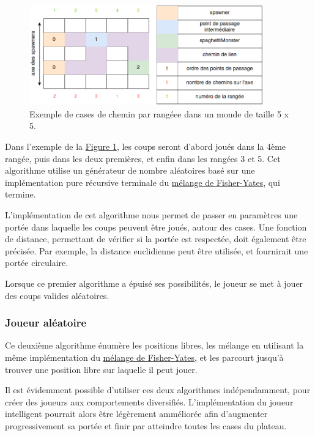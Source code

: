 \documentclass{article}
\begin{document}
\begin{figure}[H]
    \centering
    \includegraphics[width = 0.9\textwidth]{points_de_passage_4.png}
    \caption{Exemple de cases de chemin par rangéee dans un monde de taille 5 x 5.}
    \label{fig:points de passage play}
\end{figure}

Dans l'exemple de la \hyperref[fig:points de passage play]{Figure \ref{fig:points de passage play}}, les coups seront d'abord joués dans la 4ème rangée, puis dans les deux premières, et enfin dans les rangées 3 et 5.
Cet algorithme utilise un générateur de nombre aléatoires basé sur une implémentation pure récursive terminale du \hyperlink{https://fr.wikipedia.org/wiki/Mélange_de_Fisher-Yates}{mélange de Fisher-Yates}, qui termine.

L'implémentation de cet algorithme nous permet de passer en paramètres une portée dans laquelle les coups peuvent être joués, autour des cases.
Une fonction de distance, permettant de vérifier si la portée est respectée, doit également être précisée. Par exemple, la distance euclidienne peut être utilisée, et fournirait une portée circulaire.

Lorsque ce premier algorithme a épuisé ses possibilités, le joueur se met à jouer des coups valides aléatoires.

\subsubsection{Joueur aléatoire}

Ce deuxième algorithme énumère les positions libres, les mélange en utilisant la même implémentation du \hyperlink{https://fr.wikipedia.org/wiki/Mélange_de_Fisher-Yates}{mélange de Fisher-Yates}, et les parcourt jusqu'à trouver une position libre sur laquelle il peut jouer.

Il est évidemment possible d'utiliser ces deux algorithmes indépendamment, pour créer des joueurs aux comportements diversifiés. L'implémentation du joueur intelligent pourrait alors être légèrement amméliorée afin d'augmenter progressivement sa portée et finir par atteindre toutes les cases du plateau.
\end{document}
